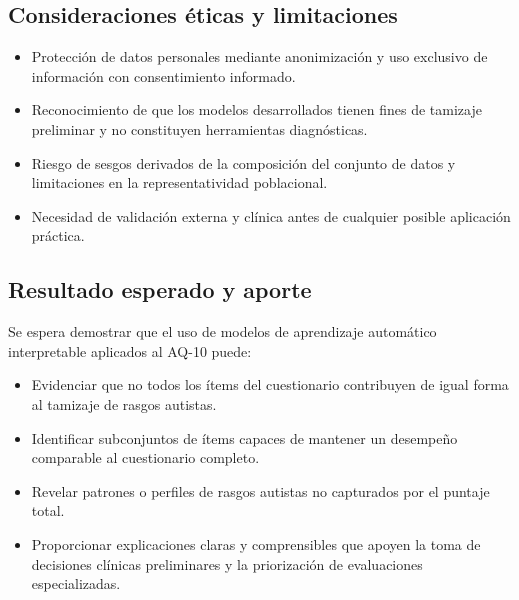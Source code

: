 \subsection{Consideraciones éticas y limitaciones}
\begin{itemize}[leftmargin=*,noitemsep]
  \item Protección de datos personales mediante anonimización y uso exclusivo de información con consentimiento informado.
  \item Reconocimiento de que los modelos desarrollados tienen fines de tamizaje preliminar y no constituyen herramientas diagnósticas.
  \item Riesgo de sesgos derivados de la composición del conjunto de datos y limitaciones en la representatividad poblacional.
  \item Necesidad de validación externa y clínica antes de cualquier posible aplicación práctica.
\end{itemize}

\subsection{Resultado esperado y aporte}
Se espera demostrar que el uso de modelos de aprendizaje automático interpretable aplicados al AQ-10 puede:
\begin{itemize}[leftmargin=*,noitemsep]
  \item Evidenciar que no todos los ítems del cuestionario contribuyen de igual forma al tamizaje de rasgos autistas.
  \item Identificar subconjuntos de ítems capaces de mantener un desempeño comparable al cuestionario completo.
  \item Revelar patrones o perfiles de rasgos autistas no capturados por el puntaje total.
  \item Proporcionar explicaciones claras y comprensibles que apoyen la toma de decisiones clínicas preliminares y la priorización de evaluaciones especializadas.
\end{itemize}